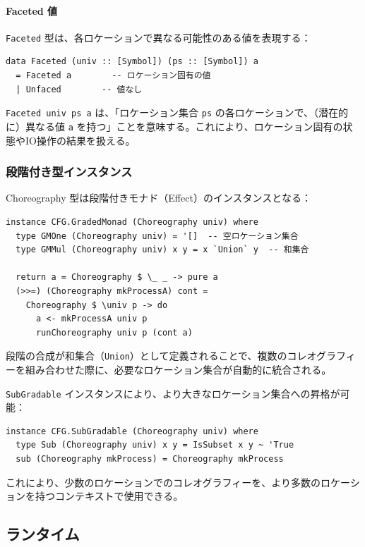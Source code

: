 \paragraph{Faceted 値}
\texttt{Faceted} 型は、各ロケーションで異なる可能性のある値を表現する：

\begin{verbatim}
data Faceted (univ :: [Symbol]) (ps :: [Symbol]) a
  = Faceted a        -- ロケーション固有の値
  | Unfaced        -- 値なし
\end{verbatim}

\texttt{Faceted univ ps a} は、「ロケーション集合 \texttt{ps} の各ロケーションで、（潜在的に）異なる値 \texttt{a} を持つ」ことを意味する。これにより、ロケーション固有の状態やIO操作の結果を扱える。

\subsubsection{段階付き型インスタンス}

Choreography 型は段階付きモナド（Effect）のインスタンスとなる：

\begin{verbatim}
instance CFG.GradedMonad (Choreography univ) where
  type GMOne (Choreography univ) = '[]  -- 空ロケーション集合
  type GMMul (Choreography univ) x y = x `Union` y  -- 和集合

  return a = Choreography $ \_ _ -> pure a
  (>>=) (Choreography mkProcessA) cont =
    Choreography $ \univ p -> do
      a <- mkProcessA univ p
      runChoreography univ p (cont a)
\end{verbatim}

段階の合成が和集合（\texttt{Union}）として定義されることで、複数のコレオグラフィーを組み合わせた際に、必要なロケーション集合が自動的に統合される。

\texttt{SubGradable} インスタンスにより、より大きなロケーション集合への昇格が可能：
\begin{verbatim}
instance CFG.SubGradable (Choreography univ) where
  type Sub (Choreography univ) x y = IsSubset x y ~ 'True
  sub (Choreography mkProcess) = Choreography mkProcess
\end{verbatim}

これにより、少数のロケーションでのコレオグラフィーを、より多数のロケーションを持つコンテキストで使用できる。

\subsection{ランタイム}
\label{sect:impl-runtime}

